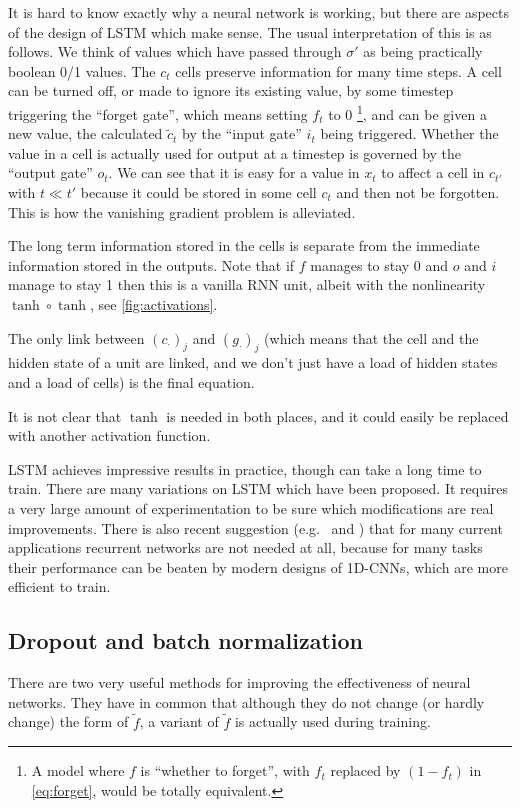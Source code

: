 It is hard to know exactly why a neural network is working, but there are aspects of the design of LSTM which make sense.
The usual interpretation of this is as follows.
We think of values which have passed through $\sigma'$ as being practically boolean 0/1 values.
The $c_t$ cells preserve information for many time steps.
A cell can be turned off, or made to ignore its existing value, by some timestep triggering the ``forget gate'', which means setting $f_t$ to 0%
\footnote{A model where $f$ is ``whether to forget'', with $f_t$ replaced by $(1-f_t)$ in \eqref{eq:forget}, would be totally equivalent.},
and can be given a new value, the calculated $\tilde c_t$ by the ``input gate'' $i_t$ being triggered.
Whether the value in a cell is actually used for output at a timestep is governed by the ``output gate'' $o_t$.
We can see that it is easy for a value in $x_t$ to affect a cell in $c_{t'}$ with $t\ll t'$ because it could be stored in some cell $c_t$ and then not be forgotten.
This is how the vanishing gradient problem is alleviated.


The long term information stored in the cells is separate from the immediate information stored in the outputs. Note that if $f$ manages to stay 0 and $o$ and $i$ manage to stay 1 then this is a vanilla RNN unit, albeit with the nonlinearity $\tanh\circ\tanh$, see \autoref{fig:activations}.

The only link between $(c_{\cdot})_j$ and $(g_\cdot)_{j}$ (which means that the cell and the hidden state of a unit are linked, and we don't just have a load of hidden states and a load of cells) is the final equation.

It is not clear that $\tanh$ is needed in both places, and it could easily be replaced with another activation function.

LSTM achieves impressive results in practice, though can take a long time to train.
There are many variations on LSTM which have been proposed.
It requires a very large amount of experimentation to be sure which modifications are real improvements.
There is also recent suggestion (e.g.~\cite{Are_LSTMs_DEAD} and \cite{NoRNN}) that for many current applications recurrent networks are not needed at all, because for many tasks their performance can be beaten by modern designs of 1D-CNNs, which are more efficient to train.


\subsection{Dropout and batch normalization}
There are two very useful methods for improving the effectiveness of neural networks.
They have in common that although they do not change (or hardly change) the form of $\tilde f$, a variant of $\tilde f$ is actually used during training.

